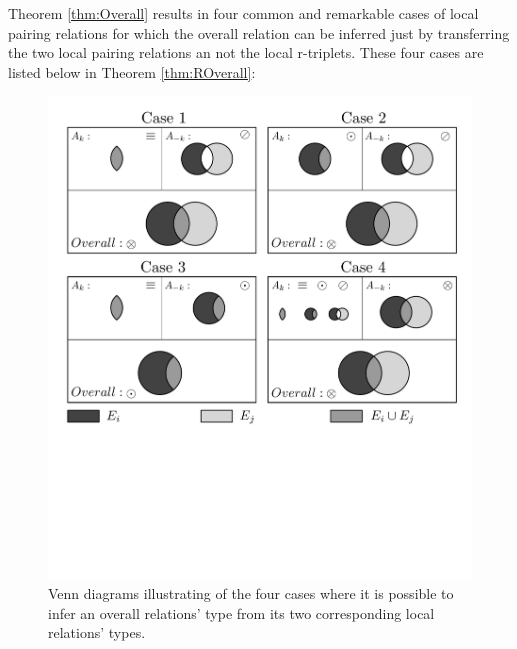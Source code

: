 Theorem \ref{thm:Overall} results in four common and remarkable cases of local pairing relations for which the overall relation can be inferred just by transferring the two local pairing relations an not the local r-triplets. These four cases are listed below in Theorem \ref{thm:ROverall}:

\begin{figure}[t]\label{fig:VennCases}
\centering
\includegraphics[scale=0.35]{figs/cases.pdf}
\caption{Venn diagrams illustrating of the four cases where it is possible to infer an overall relations' type from its two corresponding local relations' types.}
\end{figure}

